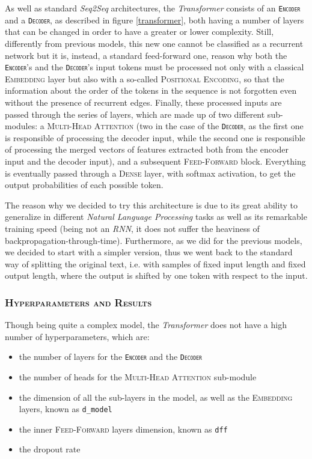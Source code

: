 As well as standard \textit{Seq2Seq} architectures, the \textit{Transformer} consists of an \texttt{\textsc{Encoder}} and a \texttt{\textsc{Decoder}}, as described in figure \ref{transformer}, both having a number of layers that can be changed in order to have a greater or lower complexity.
Still, differently from previous models, this new one cannot be classified as a recurrent network but it is, instead, a standard feed-forward one, reason why both the \texttt{\textsc{Encoder}}'s and the \texttt{\textsc{Decoder}}'s input tokens must be processed not only with a classical \textsc{Embedding} layer but also with a so-called \textsc{Positional Encoding}, so that the information about the order of the tokens in the sequence is not forgotten even without the presence of recurrent edges.
Finally, these processed inputs are passed through the series of layers, which are made up of two different sub-modules: a \textsc{Multi-Head Attention} (two in the case of the \texttt{\textsc{Decoder}}, as the first one is responsible of processing the decoder input, while the second one is responsible of processing the merged vectors of features extracted both from the encoder input and the decoder input), and a subsequent \textsc{Feed-Forward} block.
Everything is eventually passed through a \textsc{Dense} layer, with softmax activation, to get the output probabilities of each possible token.

The reason why we decided to try this architecture is due to its great ability to generalize in different \textit{Natural Language Processing} tasks as well as its remarkable training speed (being not an \textit{RNN}, it does not suffer the heaviness of backpropagation-through-time).
Furthermore, as we did for the previous models, we decided to start with a simpler version, thus we went back to the standard way of splitting the original text, i.e. with samples of fixed input length and fixed output length, where the output is shifted by one token with respect to the input.

\subsubsection{\textsc{Hyperparameters and Results}}

Though being quite a complex model, the \textit{Transformer} does not have a high number of hyperparameters, which are:
\begin{itemize}
    \item the number of layers for the \texttt{\textsc{Encoder}} and the \texttt{\textsc{Decoder}}
    \item the number of heads for the \textsc{Multi-Head Attention} sub-module
    \item the dimension of all the sub-layers in the model, as well as the \textsc{Embedding} layers, known as \texttt{d\_model}
    \item the inner \textsc{Feed-Forward} layers dimension, known as \texttt{dff}
    \item the dropout rate
\end{itemize}

